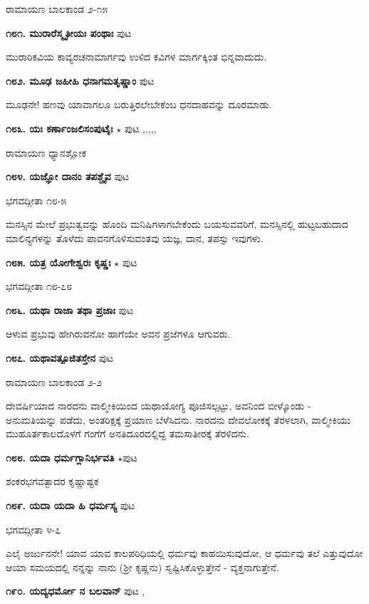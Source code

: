 {\hfill ರಾಮಾಯಣ ಬಾಲಕಾಂಡ ೨-೧೫

\medskip
\noindent\textbf{೧೮೧. ಮುರಾರೆಸ್ಮೃತೀಯಃ ಪಂಥಾಃ} \hfill ಪುಟ \pageref{43}

ಮುರಾರಿಕವಿಯ ಕಾವ್ಯರಚನಾಮಾರ್ಗವು ಉಳಿದ ಕವಿಗಳ ಮಾರ್ಗಕ್ಕಿಂತ ಭಿನ್ನವಾದುದು.

\medskip
\noindent\textbf{೧೮೨. ಮೂಢ ಜಹೀಹಿ ಧನಾಗಮತೃಷ್ಣಾಂ} \hfill ಪುಟ \pageref{55a}

ಮೂಢನೇ! ಹಣವು ಯಾವಾಗಲೂ ಬರುತ್ತಿರಲೇಬೇಕೆಂಬ ಧನದಾಹವನ್ನು ದೂರಮಾಡು.

\medskip
\noindent\textbf{೧೮೩. ಯಃ ಕರ್ಣಾಂಜಲಿಸಂಪುಟೈಃ} $\star$  \hfill ಪುಟ \pageref{152},\pageref{168a},\pageref{181b},\pageref{208a},\pageref{211e},\pageref{244a}

\hfill ರಾಮಾಯಣ ಧ್ಯಾನಶ್ಲೋಕ 

\medskip
\noindent\textbf{೧೮೪. ಯಜ್ಞೋ ದಾನಂ ತಪಶ್ಚೈವ} \hfill ಪುಟ \pageref{172}

\hfill ಭಗವದ್ಗೀತಾ ೧೮-೫

ಮನಸ್ಸಿನ ಮೇಲೆ ಪ್ರಭುತ್ವವನ್ನು ಹೊಂದಿ ಮನಿಷಿಗಳಾಗಬೇಕೆಂದು ಬಯಸುವವರಿಗೆ, ಮನಸ್ಸಿನಲ್ಲಿ ಹುಟ್ಟಬಹುದಾದ ಮಾಲಿನ್ಯಗಳನ್ನು ತೊಳೆದು ಪಾವನಗೊಳಿಸುವಂತವು ಯಜ್ಞ, ದಾನ, ತಪಸ್ಸು ಇವುಗಳು.

\medskip
\noindent\textbf{೧೮೫. ಯತ್ರ ಯೋಗೇಶ್ವರಃ ಕೃಷ್ಣಃ} $\star$ \hfill ಪುಟ \pageref{92a}

\hfill ಭಗವದ್ಗೀತಾ ೧೮-೭೮

\medskip
\noindent\textbf{೧೮೬. ಯಥಾ ರಾಜಾ ತಥಾ ಪ್ರಜಾಃ} \hfill ಪುಟ \pageref{225c}

ಆಳುವ ಪ್ರಭುವು ಹೇಗಿರುವನೋ ಹಾಗೆಯೇ ಅವನ ಪ್ರಜೆಗಳೂ ಆಗುವರು.

\medskip
\noindent\textbf{೧೮೭. ಯಥಾವತ್ಪೂಜಿತಸ್ತೇನ} \hfill ಪುಟ \pageref{197}

\hfill ರಾಮಾಯಣ ಬಾಲಕಾಂಡ ೨-೨

ದೇವರ್ಷಿಯಾದ ನಾರದನು ವಾಲ್ಮೀಕಿಯಿಂದ ಯಥಾಯೋಗ್ಯ ಪೂಜಿಸಲ್ಪಟ್ಟು, ಅವನಿಂದ ಬೀಳ್ಕೊಂಡು - ಅನುಮತಿಯನ್ನು ಪಡೆದು, ಅಂತರಿಕ್ಷಕ್ಕೆ ಪ್ರಯಾಣ ಬೆಳೆಸಿದನು. ನಾರದನು ದೇವಲೋಕಕ್ಕೆ  ತೆರಳಲಾಗಿ, ವಾಲ್ಮೀಕಿಯು ಮುಹೂರ್ತಕಾಲದೊಳಗೆ ಗಂಗೆಗೆ ಅನತಿದೂರದಲ್ಲಿದ್ದ ತಮಸಾತೀರಕ್ಕೆ ತೆರಳಿದನು.

\medskip
\noindent\textbf{೧೮೮. ಯದಾ ಧರ್ಮಗ್ಲಾನಿರ್ಭವತಿ} $\star$\hfill ಪುಟ \pageref{150b}

\hfill ಶಂಕರಭಗವತ್ಪಾದರ ಕೃಷ್ಣಾಷ್ಟಕ

\medskip
\noindent\textbf{೧೮೯. ಯದಾ ಯದಾ ಹಿ ಧರ್ಮಸ್ಯ} \hfill ಪುಟ \pageref{226a}

\hfill ಭಗವದ್ಗೀತಾ ೪-೭

ಎಲೈ ಅರ್ಜುನನೇ! ಯಾವ ಯಾವ ಕಾಲಪರಿಧಿಯಲ್ಲಿ ಧರ್ಮವು ಕಾಹಯಿಸುವುದೋ, ಆ ಧರ್ಮವು ತಲೆ  ಎತ್ತುವುದೋ ಆಯಾ ಸಮಯದಲ್ಲಿ ನನ್ನನ್ನು ನಾನು (ಶ್ರೀ ಕೃಷ್ಣನು) ಸೃಷ್ಟಿಸಿಕೊಳ್ಳುತ್ತೇನೆ - ವ್ಯಕ್ತನಾಗುತ್ತೇನೆ.

\medskip
\noindent\textbf{೧೯೦. ಯದ್ಯಧರ್ಮೋ ನ ಬಲವಾನ್} \hfill ಪುಟ \pageref{192b},\pageref{215}

}
